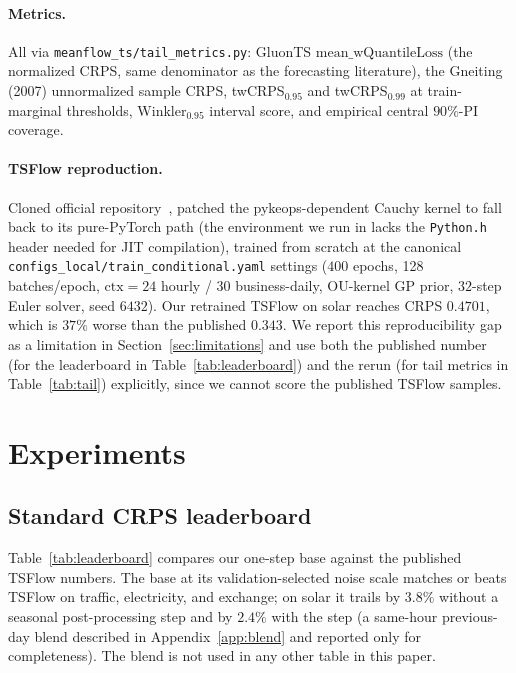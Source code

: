 \documentclass{article}
\begin{document}
\paragraph{Metrics.} All via
\texttt{meanflow\_ts/tail\_metrics.py}: GluonTS
$\mathrm{mean\_wQuantileLoss}$ (the normalized CRPS, same denominator
as the forecasting literature), the Gneiting (2007) unnormalized
sample CRPS, twCRPS$_{0.95}$ and twCRPS$_{0.99}$ at train-marginal
thresholds, Winkler$_{0.95}$ interval score, and empirical central
$90\%$-PI coverage.

\paragraph{TSFlow reproduction.} Cloned official
repository~\cite{tsflow}, patched the pykeops-dependent Cauchy
kernel to fall back to its pure-PyTorch path (the environment we run
in lacks the \texttt{Python.h} header needed for JIT compilation),
trained from scratch at the canonical
\texttt{configs\_local/train\_conditional.yaml} settings ($400$
epochs, 128 batches/epoch, $\mathrm{ctx}=24$ hourly / $30$
business-daily, OU-kernel GP prior, $32$-step Euler solver, seed
$6432$). Our retrained TSFlow on solar reaches CRPS $0.4701$, which
is $37\%$ worse than the published $0.343$. We report this
reproducibility gap as a limitation in
Section~\ref{sec:limitations} and use both the published number
(for the leaderboard in Table~\ref{tab:leaderboard}) and the rerun
(for tail metrics in Table~\ref{tab:tail}) explicitly, since we
cannot score the published TSFlow samples.

\section{Experiments}
\label{sec:experiments}

\subsection{Standard CRPS leaderboard}
\label{sec:leaderboard}

Table~\ref{tab:leaderboard} compares our one-step base against the
published TSFlow numbers. The base at its validation-selected
noise scale matches or beats TSFlow on traffic, electricity, and
exchange; on solar it trails by $3.8\%$ without a seasonal
post-processing step and by $2.4\%$ with the step (a same-hour
previous-day blend described in Appendix~\ref{app:blend} and
reported only for completeness). The blend is not used in any other
table in this paper.
\end{document}
